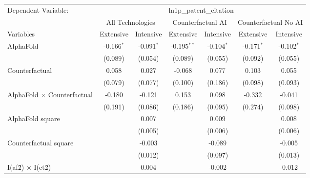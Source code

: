 \begingroup
\centering
\begin{tabular}{lcccccc}
   \tabularnewline \midrule \midrule
   Dependent Variable: & \multicolumn{6}{c}{ln1p\_patent\_citation}\\
 & \multicolumn{2}{c}{All Technologies} & \multicolumn{2}{c}{Counterfactual AI} & \multicolumn{2}{c}{Counterfactual No AI} \\
\cmidrule(lr){1-1}\cmidrule(lr){2-3} \cmidrule(lr){4-5} \cmidrule(lr){6-7}
Variables & \multicolumn{1}{c}{Extensive} & \multicolumn{1}{c}{Intensive} & \multicolumn{1}{c}{Extensive} & \multicolumn{1}{c}{Intensive} & \multicolumn{1}{c}{Extensive} & \multicolumn{1}{c}{Intensive} \\
\cmidrule(lr){1-1}\cmidrule(lr){2-2} \cmidrule(lr){3-3} \cmidrule(lr){4-4} \cmidrule(lr){5-5} \cmidrule(lr){6-6} \cmidrule(lr){7-7}
   AlphaFold                          & -0.166$^{*}$ & -0.091$^{*}$ & -0.195$^{**}$ & -0.104$^{*}$ & -0.171$^{*}$ & -0.102$^{*}$\\   
                                      & (0.089)      & (0.054)      & (0.089)       & (0.055)      & (0.092)      & (0.055)\\   
   Counterfactual                     & 0.058        & 0.027        & -0.068        & 0.077        & 0.103        & 0.055\\   
                                      & (0.079)      & (0.077)      & (0.100)       & (0.186)      & (0.098)      & (0.093)\\   
   AlphaFold $\times$ Counterfactual  & -0.180       & -0.121       & 0.153         & 0.098        & -0.332       & -0.041\\   
                                      & (0.191)      & (0.086)      & (0.186)       & (0.095)      & (0.274)      & (0.098)\\   
   AlphaFold square                   &              & 0.007        &               & 0.009        &              & 0.008\\   
                                      &              & (0.005)      &               & (0.006)      &              & (0.006)\\   
   Counterfactual square              &              & -0.003       &               & -0.089       &              & -0.005\\   
                                      &              & (0.012)      &               & (0.097)      &              & (0.013)\\   
   I(af\^2) $\times$ I(ct\^2)         &              & 0.004        &               & -0.002       &              & -0.012\\   

\end{tabular}
